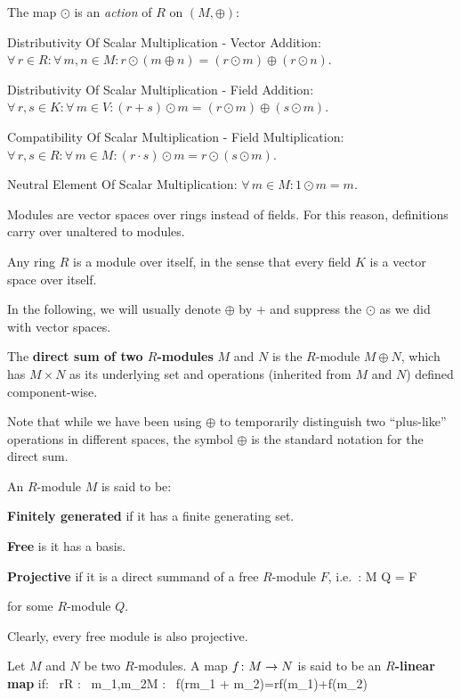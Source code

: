 \item The map $\odot$ is an \emph{action} of $R$ on $(M,\oplus)$:
\ben
\item[vi)] Distributivity Of Scalar Multiplication - Vector Addition: $\forall \, r \in R : \forall \, m,n \in M : r
\odot (m\oplus n) = (r \odot m) \oplus (r \odot n)$.
\item[vii)] Distributivity Of Scalar Multiplication - Field Addition: $\forall \, r,s \in K : \forall \, m \in V :
(r+s)\odot m = (r\odot m)\oplus (s\odot m)$.
\item[viii)] Compatibility Of Scalar Multiplication - Field Multiplication: $\forall \, r,s \in R : \forall \, m \in
M : (r\cdot s)\odot m = r \odot (s\odot m)$.
\item[ix)] Neutral Element Of Scalar Multiplication: $\forall \, m \in M : 1\odot m = m$.
\een
\eit
\ed

Modules are vector spaces over rings instead of fields. For this reason, definitions carry over unaltered to modules.

\be
Any ring $R$ is a module over itself, in the sense that every field $K$ is a vector space over itself.
\ee

In the following, we will usually denote $\oplus$ by $+$ and suppress the $\odot$ as we did with vector spaces.

The \textbf{direct sum of two $R$-modules} $M$ and $N$ is the $R$-module $M\oplus N$, which has $M\times N$ as its
underlying set and operations (inherited from $M$ and $N$) defined component-wise.
\ed

Note that while we have been using $\oplus$ to temporarily distinguish two ``plus-like'' operations in different
spaces, the symbol $\oplus$ is the standard notation for the direct sum.

An $R$-module $M$ is said to be:
\bit
\item \textbf{Finitely generated} if it has a finite generating set.
\item \textbf{Free} is it has a basis.
\item \textbf{Projective} if it is a direct summand of a free $R$-module $F$, i.e.\ :
\bse
M \oplus Q = F
\ese

for some $R$-module $Q$.
\eit
\ed

\be
Clearly, every free module is also projective.
\ee

Let $M$ and $N$ be two $R$-modules. A map $f\colon M \to N$ is said to be an \textbf{$R$-linear map} if:
\bse
\forall \, r\in R : \forall \, m_1,m_2\in M : \ f(rm_1 + m_2)=rf(m_1)+f(m_2)
\ese

